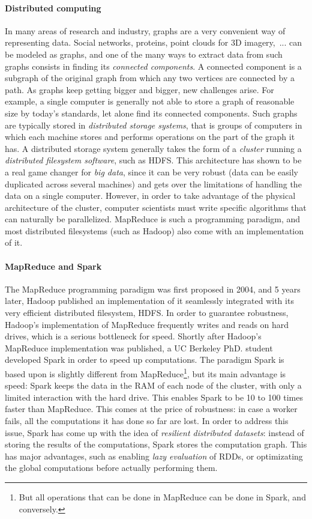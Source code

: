 \documentclass[a4paper,12pt]{article}
\begin{document}
\paragraph{Distributed computing} In many areas of research and industry, graphs are a very convenient way of representing data. Social networks, proteins, point clouds for 3D imagery,~... can be modeled as graphs, and one of the many ways to extract data from such graphs consists in finding its \emph{connected components}. A connected component is a subgraph of the original graph from which any two vertices are connected by a path. As graphs keep getting bigger and bigger, new challenges arise. For example, a single computer is generally not able to store a graph of reasonable size by today's standards, let alone find its connected components. Such graphs are typically stored in \emph{distributed storage systems}, that is groups of computers in which each machine stores and performs operations on the part of the graph it has. A distributed storage system generally takes the form of a \emph{cluster} running a \emph{distributed filesystem software}, such as HDFS. This architecture has shown to be a real game changer for \emph{big data}, since it can be very robust (data can be easily duplicated across several machines) and gets over the limitations of handling the data on a single computer. However, in order to take advantage of the physical architecture of the cluster, computer scientists must write specific algorithms that can naturally be parallelized. MapReduce is such a programming paradigm, and most distributed filesystems (such as Hadoop) also come with an implementation of it.

\paragraph{MapReduce and Spark} The MapReduce programming paradigm was first proposed in 2004, and 5 years later, Hadoop published an implementation of it seamlessly integrated with its very efficient distributed filesystem, HDFS. In order to guarantee robustness, Hadoop's implementation of MapReduce frequently writes and reads on hard drives, which is a serious bottleneck for speed. Shortly after Hadoop's MapReduce implementation was published, a UC Berkeley PhD. student developed Spark in order to speed up computations. The paradigm Spark is based upon is slightly different from MapReduce\footnote{But all operations that can be done in MapReduce can be done in Spark, and conversely.}, but its main advantage is speed: Spark keeps the data in the RAM of each node of the cluster, with only a limited interaction with the hard drive. This enables Spark to be 10 to 100 times faster than MapReduce. This comes at the price of robustness: in case a worker fails, all the computations it has done so far are lost. In order to address this issue, Spark has come up with the idea of \emph{resilient distributed datasets}: instead of storing the results of the computations, Spark stores the computation graph. This has major advantages, such as enabling \emph{lazy evaluation} of RDDs, or optimizating the global computations before actually performing them.
\end{document}
